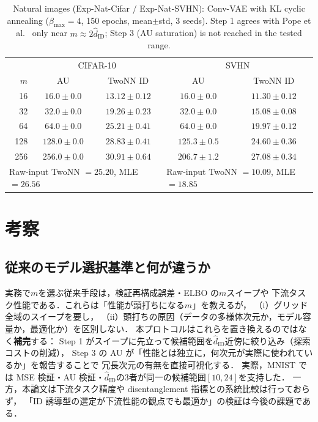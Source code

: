 \documentclass[11pt,a4paper]{jsarticle}
\newcommand{\hatdID}{\hat{d}_{\mathrm{ID}}}
\begin{document}
\begin{table}[H]
\centering
\caption{Natural images (Exp-Nat-Cifar / Exp-Nat-SVHN): Conv-VAE with KL
cyclic annealing ($\beta_{\max} = 4$, 150 epochs, mean$\pm$std, 3 seeds).
Step 1 agrees with Pope et al.~\cite{pope2021intrinsic} only near
$m \approx 2\hatdID$; Step 3 (AU saturation) is not reached in the tested
range.}
\label{tab:natural}
\small
\begin{tabular}{r cc | cc}
\toprule
 & \multicolumn{2}{c|}{CIFAR-10} & \multicolumn{2}{c}{SVHN} \\
$m$ & AU & TwoNN ID & AU & TwoNN ID \\
\midrule
 16 & $16.0 \pm 0.0$ & $13.12 \pm 0.12$ & $16.0 \pm 0.0$ & $11.30 \pm 0.12$ \\
 32 & $32.0 \pm 0.0$ & $19.26 \pm 0.23$ & $32.0 \pm 0.0$ & $15.08 \pm 0.08$ \\
 64 & $64.0 \pm 0.0$ & $\mathbf{25.21 \pm 0.41}$ & $64.0 \pm 0.0$ & $19.97 \pm 0.12$ \\
128 & $128.0 \pm 0.0$ & $28.83 \pm 0.41$ & $125.3 \pm 0.5$ & $24.60 \pm 0.36$ \\
256 & $256.0 \pm 0.0$ & $30.91 \pm 0.64$ & $206.7 \pm 1.2$ & $27.08 \pm 0.34$ \\
\midrule
\multicolumn{3}{l|}{Raw-input TwoNN $= 25.20$, MLE $= 26.56$} &
\multicolumn{2}{l}{Raw-input TwoNN $= 10.09$, MLE $= 18.85$} \\
\bottomrule
\end{tabular}
\end{table}

\section{考察}\label{sec:discussion}

\subsection{従来のモデル選択基準と何が違うか}\label{sec:disc_model_selection}

実務で$m$を選ぶ従来手段は，検証再構成誤差・ELBO の$m$スイープや
下流タスク性能である．これらは「性能が頭打ちになる$m$」を教えるが，
（i）グリッド全域のスイープを要し，
（ii）頭打ちの原因（データの多様体次元か，モデル容量か，最適化か）を区別しない．
本プロトコルはこれらを置き換えるのではなく\textbf{補完}する：
Step 1 がスイープに先立って候補範囲を$\hatdID$近傍に絞り込み（探索コストの削減），
Step 3 の AU が「性能とは独立に，何次元が実際に使われているか」を報告することで
冗長次元の有無を直接可視化する．
実際，MNIST では MSE 検証・AU 検証・$\hatdID$の3者が同一の候補範囲$[10, 24]$を支持した．
一方，本論文は下流タスク精度や disentanglement 指標との系統比較は行っておらず，
「ID 誘導型の選定が下流性能の観点でも最適か」の検証は今後の課題である．
\end{document}
